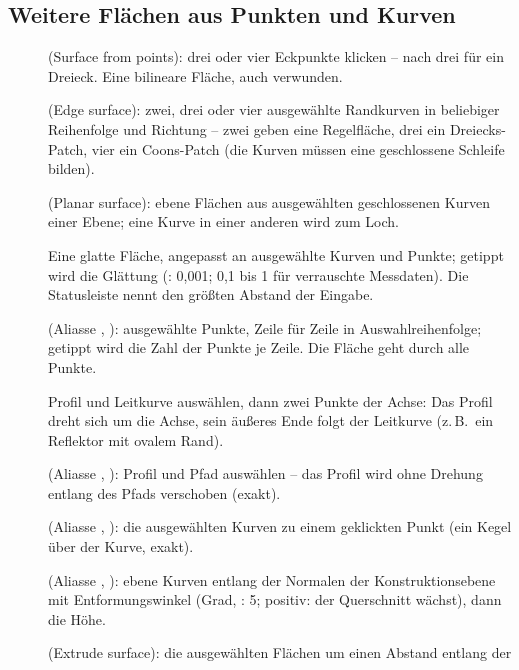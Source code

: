 \subsection{Weitere Flächen aus Punkten und Kurven}\label{sec:cmd-surfaces-more}
\begin{description}
\item[] (Surface from points): drei oder vier Eckpunkte klicken -- nach drei
   für ein Dreieck. Eine bilineare Fläche, auch verwunden.
\item[] (Edge surface): zwei, drei oder vier ausgewählte Randkurven in beliebiger
  Reihenfolge und Richtung -- zwei geben eine Regelfläche, drei ein Dreiecks-Patch, vier ein
  Coons-Patch (die Kurven müssen eine geschlossene Schleife bilden).
\item[] (Planar surface): ebene Flächen aus ausgewählten geschlossenen Kurven einer
  Ebene; eine Kurve in einer anderen wird zum Loch.
\item[] Eine glatte Fläche, angepasst an ausgewählte Kurven und Punkte; getippt wird
  die Glättung (: 0,001; 0,1 bis 1 für verrauschte Messdaten). Die Statusleiste nennt
  den größten Abstand der Eingabe.
\item[] (Aliasse , ): ausgewählte Punkte, Zeile
  für Zeile in Auswahlreihenfolge; getippt wird die Zahl der Punkte je Zeile. Die Fläche geht durch
  alle Punkte.
\item[] Profil und Leitkurve auswählen, dann zwei Punkte der Achse: Das Profil
  dreht sich um die Achse, sein äußeres Ende folgt der Leitkurve (z.\,B.\ ein Reflektor mit
  ovalem Rand).
\item[] (Aliasse , ): Profil und
  Pfad auswählen -- das Profil wird ohne Drehung entlang des Pfads verschoben (exakt).
\item[] (Aliasse , ): die
  ausgewählten Kurven zu einem geklickten Punkt (ein Kegel über der Kurve, exakt).
\item[] (Aliasse , ): ebene
  Kurven entlang der Normalen der Konstruktionsebene mit Entformungswinkel (Grad, : 5;
  positiv: der Querschnitt wächst), dann die Höhe.
\item[] (Extrude surface): die ausgewählten Flächen um einen Abstand entlang der

\end{description}
